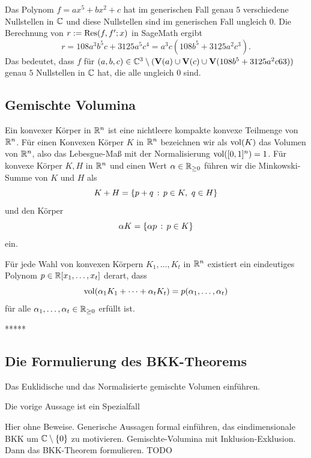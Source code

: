 \documentclass[11pt]{article}
\numberwithin{equation}{section}
\begin{document}
\begin{beispiel} 
	Das Polynom $f= a x^5 + b x^2 + c$ hat im generischen Fall genau $5$ verschiedene Nullstellen in $\mathbb{C}$ und diese Nullstellen sind im generischen Fall ungleich $0$. Die Berechnung von $r := \operatorname{Res}(f,f';x)$ in SageMath ergibt 
	\[
	r = 108 a^{3} b^{5} c + 3125 a^{5} c^{4} =  a^3 c ( 108  b^5  + 3125 a^2 c^3). 
	\]
	Das bedeutet, dass $f$ für $(a,b,c) \in \mathbb{C}^3 \setminus (\mathbf{V}(a) \cup \mathbf{V}(c) \cup \mathbf{V}(108 b^5 + 3125 a^2 c6 3))$ genau $5$ Nullstellen in $\mathbb{C}$ hat, die alle ungleich $0$ sind. 
\end{beispiel} 

\subsection{Gemischte Volumina} 

Ein konvexer Körper in $\mathbb{R}^n$ ist eine nichtleere kompakte konvexe Teilmenge von $\mathbb{R}^n$. Für einen Konvexen Körper $K$ in $\mathbb{R}^n$ bezeichnen wir als 
$\operatorname{vol}(K)$ das Volumen von $\mathbb{R}^n$, also das Lebesgue-Maß mit der Normalisierung $\operatorname{vol}([0,1]^n) = 1$. Für konvexe Körper $K, H $ in $\mathbb{R}^n$ und einen Wert $\alpha \in \mathbb{R}_{\ge 0}$ führen wir die Minkowski-Summe von $K$ und $H$ als 
\[
K + H = \left\{  p + q \,:\, p \in K, \ q \in H \right\}
\] 
und den Körper 
\[
\alpha K = \left\{  \alpha p  \,:\, p \in K \right\}
\] 
ein. 

\begin{theorem}[Minkowski] 
	Für jede Wahl von konvexen Körpern $K_1,\ldots,K_t$ in $\mathbb{R}^n$ existiert ein  eindeutiges Polynom $p \in \mathbb{R}[x_1,\ldots,x_t]$ derart, dass 
	\[
	\operatorname{vol}(\alpha_1 K_1 + \cdots + \alpha_t K_t) = p(\alpha_1,\dots,\alpha_t)
	\] 
	für alle $\alpha_1,\ldots,\alpha_t \in \mathbb{R}_{\ge 0}$ erfüllt ist. 
\end{theorem} 
***** 

\subsection{Die Formulierung des BKK-Theorems} 

Das Euklidische und das Normalisierte gemischte Volumen einführen. 

Die vorige Aussage ist ein Spezialfall 

Hier ohne Beweise. Generische Aussagen formal einführen, das eindimensionale BKK um $\mathbb{C} \setminus \{0\}$ zu motivieren. Gemischte-Volumina mit Inklusion-Exklusion. Dann das BKK-Theorem formulieren. 
TODO
\end{document}
